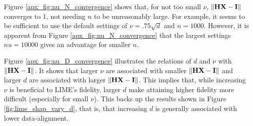 \documentclass[mnsc,blindrev]{informs3}
\begin{document}
                    Figure \ref{apx_fig:nu_N_convergence} shows that, for not too small $\nu$, $\norm{\mathbf{H}\mathbf{X} - \mathbf{I}}$ converges to $1$, not needing $n$ to be unreasonably large. For example, it seems to be sufficient to use the default settings of $\nu = .75\sqrt{d}$ and $n=1000$. However, it is apparent from Figure \ref{apx_fig:nu_N_convergence} that the largest settings $nu=10000$ gives an advantage for smaller $n$.  

                    Figure \ref{apx_fig:nu_D_convergence} illustrates the relations of $d$ and $\nu$ with $\norm{\mathbf{H}\mathbf{X} - \mathbf{I}}$. It shows that larger $\nu$ are associated with smaller $\norm{\mathbf{H}\mathbf{X} - \mathbf{I}}$ and larger $d$ are associated with larger $\norm{\mathbf{H}\mathbf{X} - \mathbf{I}}$. This implies that, while increasing $\nu$ is beneficial to LIME's fidelity, larger $d$ make attaining higher fidelity more difficult (especially for small $\nu$). This backs up the results shown in Figure \ref{fig:lime_shap_vary_d}, that is, that increasing $d$ is generally associated with lower data-alignment. 
    

    
\end{document}
